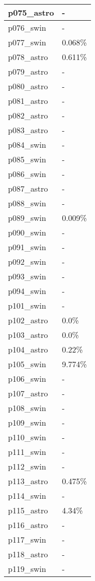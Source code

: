 \documentclass{article}%
\begin{document}
\begin{longtabu}{X[l] X[r]}
\hline%
p075\_astro&{-}\\%
\hline%
p076\_swin&{-}\\%
\hline%
p077\_swin&0.068\%\\%
\hline%
p078\_astro&0.611\%\\%
\hline%
p079\_astro&{-}\\%
\hline%
p080\_astro&{-}\\%
\hline%
p081\_astro&{-}\\%
\hline%
p082\_astro&{-}\\%
\hline%
p083\_astro&{-}\\%
\hline%
p084\_swin&{-}\\%
\hline%
p085\_swin&{-}\\%
\hline%
p086\_swin&{-}\\%
\hline%
p087\_astro&{-}\\%
\hline%
p088\_swin&{-}\\%
\hline%
p089\_swin&0.009\%\\%
\hline%
p090\_swin&{-}\\%
\hline%
p091\_swin&{-}\\%
\hline%
p092\_swin&{-}\\%
\hline%
p093\_swin&{-}\\%
\hline%
p094\_swin&{-}\\%
\hline%
p101\_swin&{-}\\%
\hline%
p102\_astro&0.0\%\\%
\hline%
p103\_astro&0.0\%\\%
\hline%
p104\_astro&0.22\%\\%
\hline%
p105\_swin&9.774\%\\%
\hline%
p106\_swin&{-}\\%
\hline%
p107\_astro&{-}\\%
\hline%
p108\_swin&{-}\\%
\hline%
p109\_swin&{-}\\%
\hline%
p110\_swin&{-}\\%
\hline%
p111\_swin&{-}\\%
\hline%
p112\_swin&{-}\\%
\hline%
p113\_astro&0.475\%\\%
\hline%
p114\_swin&{-}\\%
\hline%
p115\_astro&4.34\%\\%
\hline%
p116\_astro&{-}\\%
\hline%
p117\_swin&{-}\\%
\hline%
p118\_astro&{-}\\%
\hline%
p119\_swin&{-}\\%

\end{longtabu}
\end{document}
